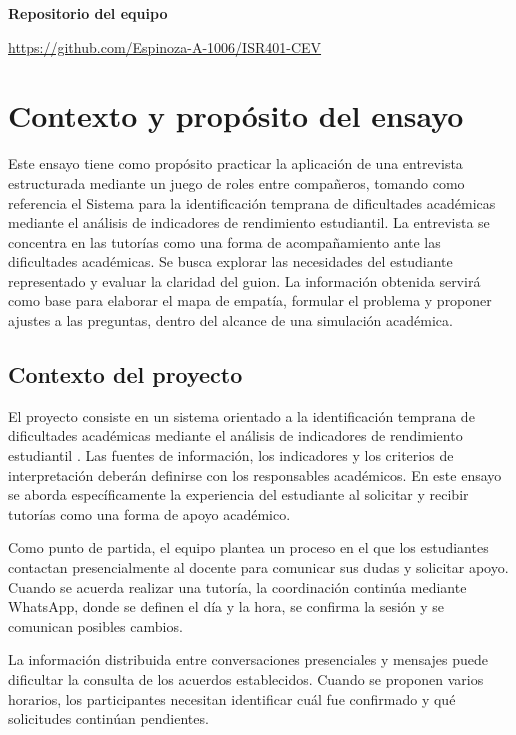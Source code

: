 \documentclass[11pt,a4paper]{article}
\begin{document}
\vspace{0.4cm}

\textbf{Repositorio del equipo}

{\small
\mbox{\url{https://github.com/Espinoza-A-1006/ISR401-CEV}}
}

\newpage

\section{Contexto y propósito del ensayo}

Este ensayo tiene como propósito practicar la aplicación de
una entrevista estructurada mediante un juego de roles entre
compañeros, tomando como referencia el Sistema para la
identificación temprana de dificultades académicas mediante
el análisis de indicadores de rendimiento estudiantil.
La entrevista se concentra en las tutorías como una forma
de acompañamiento ante las dificultades académicas.
Se busca explorar las necesidades del estudiante representado
y evaluar la claridad del guion. La información obtenida
servirá como base para elaborar el mapa de empatía, formular
el problema y proponer ajustes a las preguntas, dentro del
alcance de una simulación académica.

\subsection{Contexto del proyecto}

El proyecto consiste en un sistema orientado a la identificación
temprana de dificultades académicas mediante el análisis de
indicadores de rendimiento estudiantil \cite{chang2025, martins2019}. Las fuentes de información,
los indicadores y los criterios de interpretación deberán
definirse con los responsables académicos. En este ensayo se
aborda específicamente la experiencia del estudiante al solicitar
y recibir tutorías como una forma de apoyo académico.

Como punto de partida, el equipo plantea un proceso en el que los
estudiantes contactan presencialmente al docente para comunicar sus
dudas y solicitar apoyo. Cuando se acuerda realizar una tutoría,
la coordinación continúa mediante WhatsApp, donde se definen el día
y la hora, se confirma la sesión y se comunican posibles cambios.

La información distribuida entre conversaciones presenciales y
mensajes puede dificultar la consulta de los acuerdos establecidos.
Cuando se proponen varios horarios, los participantes necesitan
identificar cuál fue confirmado y qué solicitudes continúan
pendientes.
\end{document}
